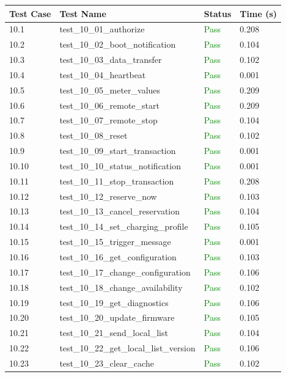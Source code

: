 \documentclass{article}
\begin{document}
\begin{longtable}{p{} p{} p{} p{}}
\toprule
\textbf{Test Case} & \textbf{Test Name} & \textbf{Status} & \textbf{Time (s)} \\
\midrule
\endhead
10.1 & test\_10\_01\_authorize & \textcolor{green}{Pass} & 0.208 \\
10.2 & test\_10\_02\_boot\_notification & \textcolor{green}{Pass} & 0.104 \\
10.3 & test\_10\_03\_data\_transfer & \textcolor{green}{Pass} & 0.102 \\
10.4 & test\_10\_04\_heartbeat & \textcolor{green}{Pass} & 0.001 \\
10.5 & test\_10\_05\_meter\_values & \textcolor{green}{Pass} & 0.209 \\
10.6 & test\_10\_06\_remote\_start & \textcolor{green}{Pass} & 0.209 \\
10.7 & test\_10\_07\_remote\_stop & \textcolor{green}{Pass} & 0.104 \\
10.8 & test\_10\_08\_reset & \textcolor{green}{Pass} & 0.102 \\
10.9 & test\_10\_09\_start\_transaction & \textcolor{green}{Pass} & 0.001 \\
10.10 & test\_10\_10\_status\_notification & \textcolor{green}{Pass} & 0.001 \\
10.11 & test\_10\_11\_stop\_transaction & \textcolor{green}{Pass} & 0.208 \\
10.12 & test\_10\_12\_reserve\_now & \textcolor{green}{Pass} & 0.103 \\
10.13 & test\_10\_13\_cancel\_reservation & \textcolor{green}{Pass} & 0.104 \\
10.14 & test\_10\_14\_set\_charging\_profile & \textcolor{green}{Pass} & 0.105 \\
10.15 & test\_10\_15\_trigger\_message & \textcolor{green}{Pass} & 0.001 \\
10.16 & test\_10\_16\_get\_configuration & \textcolor{green}{Pass} & 0.103 \\
10.17 & test\_10\_17\_change\_configuration & \textcolor{green}{Pass} & 0.106 \\
10.18 & test\_10\_18\_change\_availability & \textcolor{green}{Pass} & 0.102 \\
10.19 & test\_10\_19\_get\_diagnostics & \textcolor{green}{Pass} & 0.106 \\
10.20 & test\_10\_20\_update\_firmware & \textcolor{green}{Pass} & 0.105 \\
10.21 & test\_10\_21\_send\_local\_list & \textcolor{green}{Pass} & 0.104 \\
10.22 & test\_10\_22\_get\_local\_list\_version & \textcolor{green}{Pass} & 0.106 \\
10.23 & test\_10\_23\_clear\_cache & \textcolor{green}{Pass} & 0.102 \\
\bottomrule
\end{longtable}
\end{document}
